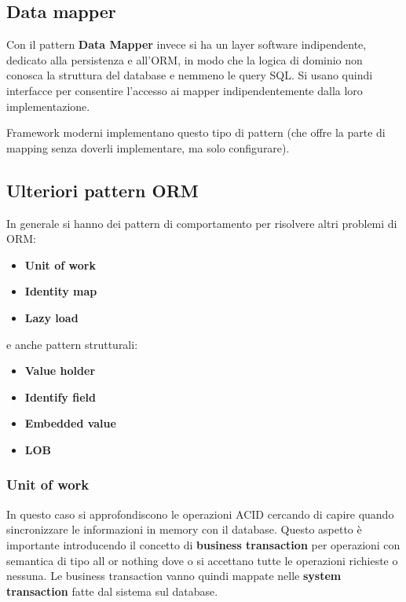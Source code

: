 \subsection{Data mapper}
Con il pattern \textbf{Data Mapper} invece si ha un layer software indipendente,
dedicato alla persistenza e all'ORM, in modo che la logica di dominio non conosca
la struttura del database e nemmeno le query SQL. Si usano quindi interfacce per
consentire l'accesso ai mapper indipendentemente dalla loro implementazione.

Framework moderni implementano questo tipo di pattern (che offre la parte di
mapping senza doverli implementare, ma solo configurare).
\subsection{Ulteriori pattern ORM}
In generale si hanno dei pattern di comportamento per risolvere altri problemi
di ORM:
\begin{itemize}
      \item \textbf{Unit of work}
      \item \textbf{Identity map}
      \item \textbf{Lazy load}
\end{itemize}
e anche pattern strutturali:
\begin{itemize}
      \item \textbf{Value holder}
      \item \textbf{Identify field}
      \item \textbf{Embedded value}
      \item \textbf{LOB}
\end{itemize}
\subsubsection{Unit of work}
In questo caso si approfondiscono le operazioni ACID cercando di capire quando
sincronizzare le informazioni in memory con il database. Questo aspetto è
importante introducendo il concetto di \textbf{business transaction} per
operazioni con semantica di tipo all or nothing dove o si accettano tutte le
operazioni richieste o nessuna. Le business transaction vanno quindi mappate
nelle \textbf{system transaction} fatte dal sistema sul database.

